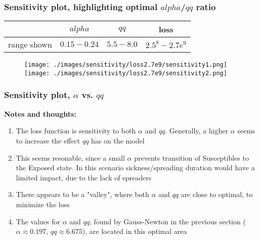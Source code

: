 \documentclass{beamer}
\begin{document}
\begin{frame}
	\frametitle{Sensitivity plot, highlighting optimal $alpha$/$qq$ ratio}
	\begin{center}
		\begin{tabular}{|c|c|c|c|}
			\hline & $alpha$ & $qq$ & loss \\
			\hline range shown & $0.15-0.24$ & $5.5-8.0$ & $2.5^{8}-2.7e^{9}$\\
			\hline
		\end{tabular}
		\begin{figure}
				\hspace{-1.4cm}
				\texttt{[image: ./images/sensitivity/loss2.7e9/sensitivity1.png]}\hspace{-1cm}%
				\texttt{[image: ./images/sensitivity/loss2.7e9/sensitivity2.png]}
		\end{figure}
	\end{center}
\end{frame}

\begin{frame}
	\frametitle{Sensitivity plot, $\alpha$ vs. $qq$}
	\textbf{Notes and thoughts:}
	\begin{enumerate}[$\bullet$]
		\item The loss function is sensitivity to both $\alpha$ and $qq$. Generally, a higher $\alpha$
			seems to increase the effect $qq$ has on the model
		\item This seems resonable, since a small $\alpha$ prevents transition of Susceptibles to the Exposed state. In this scenario
			sickness/spreading duration would have a limited impact, due to the lack of spreaders
		\item There appears to be a "valley", where both $\alpha$ and $qq$ are close to optimal, to minimize the loss
		\item The values for $\alpha$ and $qq$, found by Gauss-Newton in the previous section ($\alpha \approx 0.197$, $qq \approx 6.675$),
			are located in this optimal area
	\end{enumerate}
\end{frame}

\end{document}
